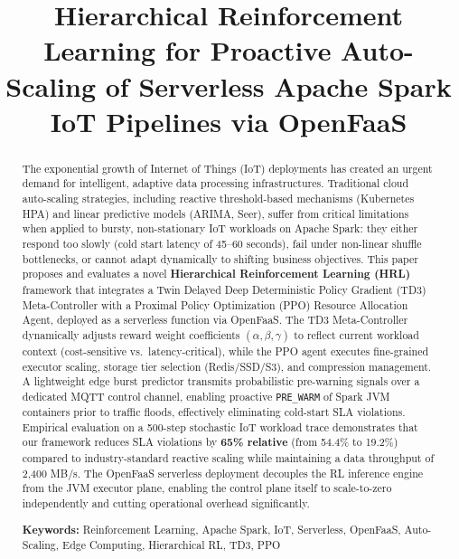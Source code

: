 \documentclass[10pt, conference, compsocconf]{IEEEtran}
\begin{document}
\title{Hierarchical Reinforcement Learning for Proactive Auto-Scaling of Serverless Apache Spark IoT Pipelines via OpenFaaS}

\author{
\and
{}
}

\maketitle

\begin{abstract}
The exponential growth of Internet of Things (IoT) deployments has created an urgent demand for intelligent, adaptive data processing infrastructures. Traditional cloud auto-scaling strategies, including reactive threshold-based mechanisms (Kubernetes HPA) and linear predictive models (ARIMA, Seer), suffer from critical limitations when applied to bursty, non-stationary IoT workloads on Apache Spark: they either respond too slowly (cold start latency of 45--60 seconds), fail under non-linear shuffle bottlenecks, or cannot adapt dynamically to shifting business objectives. This paper proposes and evaluates a novel \textbf{Hierarchical Reinforcement Learning (HRL)} framework that integrates a Twin Delayed Deep Deterministic Policy Gradient (TD3) Meta-Controller with a Proximal Policy Optimization (PPO) Resource Allocation Agent, deployed as a serverless function via OpenFaaS. The TD3 Meta-Controller dynamically adjusts reward weight coefficients $(\alpha, \beta, \gamma)$ to reflect current workload context (cost-sensitive vs.\ latency-critical), while the PPO agent executes fine-grained executor scaling, storage tier selection (Redis/SSD/S3), and compression management. A lightweight edge burst predictor transmits probabilistic pre-warning signals over a dedicated MQTT control channel, enabling proactive \texttt{PRE\_WARM} of Spark JVM containers prior to traffic floods, effectively eliminating cold-start SLA violations. Empirical evaluation on a 500-step stochastic IoT workload trace demonstrates that our framework reduces SLA violations by \textbf{65\% relative} (from 54.4\% to 19.2\%) compared to industry-standard reactive scaling while maintaining a data throughput of 2,400 MB/s. The OpenFaaS serverless deployment decouples the RL inference engine from the JVM executor plane, enabling the control plane itself to scale-to-zero independently and cutting operational overhead significantly.

\medskip
\textbf{Keywords:} Reinforcement Learning, Apache Spark, IoT, Serverless, OpenFaaS, Auto-Scaling, Edge Computing, Hierarchical RL, TD3, PPO

\end{abstract}
\end{document}
